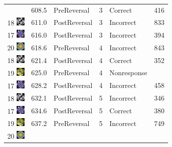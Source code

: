 \documentclass[]{article}
\begin{document}
\begin{longtable}[]{@{}lrlrll@{}}
& 608.5 & PreReversal & 3 & Correct & 416\tabularnewline
18
\includegraphics[width=0.16670in,height=0.16670in]{../ReversalLearning_20130621/images/abs18.jpg}
& 611.0 & PostReversal & 3 & Incorrect & 833\tabularnewline
17
\includegraphics[width=0.16670in,height=0.16670in]{../ReversalLearning_20130621/images/abs17.jpg}
& 616.0 & PostReversal & 3 & Incorrect & 394\tabularnewline
20
\includegraphics[width=0.16670in,height=0.16670in]{../ReversalLearning_20130621/images/abs20.jpg}
& 618.6 & PreReversal & 4 & Incorrect & 843\tabularnewline
18
\includegraphics[width=0.16670in,height=0.16670in]{../ReversalLearning_20130621/images/abs18.jpg}
& 621.4 & PostReversal & 4 & Correct & 352\tabularnewline
19
\includegraphics[width=0.16670in,height=0.16670in]{../ReversalLearning_20130621/images/abs19.jpg}
& 625.0 & PreReversal & 4 & Nonresponse &\tabularnewline
17
\includegraphics[width=0.16670in,height=0.16670in]{../ReversalLearning_20130621/images/abs17.jpg}
& 628.2 & PostReversal & 4 & Incorrect & 458\tabularnewline
18
\includegraphics[width=0.16670in,height=0.16670in]{../ReversalLearning_20130621/images/abs18.jpg}
& 632.1 & PostReversal & 5 & Incorrect & 346\tabularnewline
17
\includegraphics[width=0.16670in,height=0.16670in]{../ReversalLearning_20130621/images/abs17.jpg}
& 634.6 & PostReversal & 5 & Correct & 380\tabularnewline
19
\includegraphics[width=0.16670in,height=0.16670in]{../ReversalLearning_20130621/images/abs19.jpg}
& 637.2 & PreReversal & 5 & Incorrect & 749\tabularnewline
20
\includegraphics[width=0.16670in,height=0.16670in]{../ReversalLearning_20130621/images/abs20.jpg}

\end{longtable}
\end{document}
